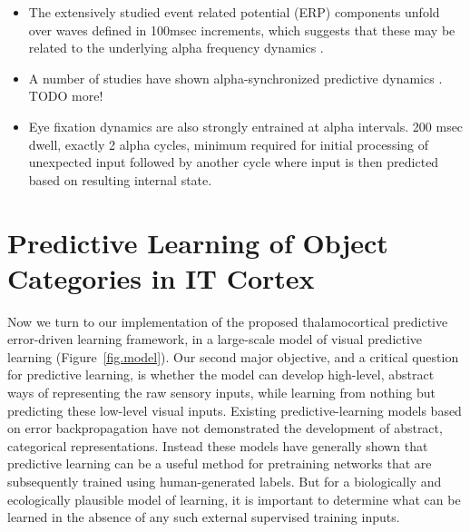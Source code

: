 \documentclass[11pt,twoside]{article}
\newif\myifpdf
\begin{document}
\begin{itemize}
	\item The extensively studied event related potential (ERP) components unfold over waves defined in 100msec increments, which suggests that these may be related to the underlying alpha frequency dynamics \cite{MakeigWesterfieldJungEtAl02,GruberKlimeschSausengEtAl05,Klimesch11}.
	\item A number of studies have shown alpha-synchronized predictive dynamics \cite{MayerSchwiedrzikWibralEtAl16}.  TODO more!
	\item Eye fixation dynamics are also strongly entrained at alpha intervals.  200 msec dwell, exactly 2 alpha cycles, minimum required for initial processing of unexpected input followed by another cycle where input is then predicted based on resulting internal state.
\end{itemize}


\section{Predictive Learning of Object Categories in IT Cortex}

Now we turn to our implementation of the proposed thalamocortical predictive error-driven learning framework, in a large-scale model of visual predictive learning (Figure~\ref{fig.model}).  Our second major objective, and a critical question for predictive learning, is whether the model can develop high-level, abstract ways of representing the raw sensory inputs, while learning from nothing but predicting these low-level visual inputs.  Existing predictive-learning models based on error backpropagation \cite{LotterKreimanCox16,JakeAddOthers} have not demonstrated the development of abstract, categorical representations.  Instead these models have generally shown that predictive learning can be a useful method for pretraining networks that are subsequently trained using human-generated labels.  But for a biologically and ecologically plausible model of learning, it is important to determine what can be learned in the absence of any such external supervised training inputs.
\end{document}
